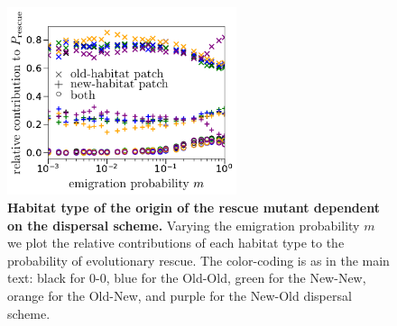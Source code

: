 \documentclass[a4paper,11pt]{scrartcl}
\begin{document}
\begin{figure}[h!]
	\centering
	\includegraphics[width=0.6\textwidth]{figS7.pdf}
  	\caption{\textbf{Habitat type of the origin of the rescue mutant dependent on the dispersal scheme.} Varying the emigration probability $m$ we plot the relative contributions of each habitat type to the probability of evolutionary rescue. The color-coding is as in the main text: black for 0-0, blue for the Old-Old, green for the New-New, orange for the Old-New, and purple for the New-Old dispersal scheme.}
	\label{Sfig:natal_habitat}
\end{figure}

\newpage


\end{document}
